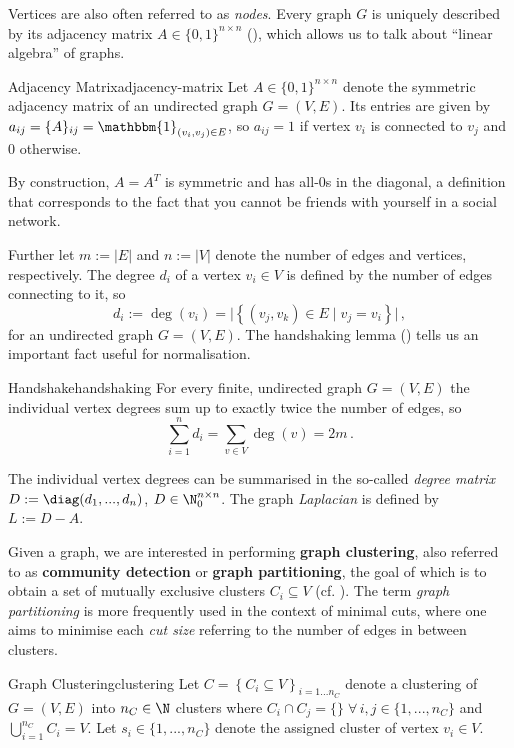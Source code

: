 \documentclass[12pt, a4paper]{article}
\newcommand{\identity}{\mathbbm{1}}
\begin{document}
  Vertices are also often referred to as \textit{nodes}.
  Every graph $G$ is uniquely described by its adjacency matrix $A \in \{0, 1\}^{n \times n}$ (), which allows us to talk about ``linear algebra'' of graphs.

  \begin{definition}{Adjacency Matrix}{adjacency-matrix}
    Let $A \in \{0, 1\}^{n \times n}$ denote the symmetric adjacency matrix of an undirected graph $G = (V, E)$. Its entries are given by $a_{ij} = \{A\}_{ij} = \identity_{(v_i, v_j) \in E}$, so $a_{ij} = 1$ if vertex $v_i$ is connected to $v_j$ and $0$ otherwise.
  \end{definition}

  By construction, $A = A^T$ is symmetric and has all-$0$s in the diagonal, a definition that corresponds to the fact that you cannot be friends with yourself in a social network.

  Further let $m := |E|$ and $n := |V|$ denote the number of edges and vertices, respectively.
  The degree $d_i$ of a vertex $v_i \in V$ is defined by the number of edges connecting to it, so $$d_i := \deg(v_i) = \big|\left\{(v_j, v_k) \in E \;|\; v_j = v_i\right\}\big|\,,$$ for an undirected graph $G = (V, E)$. The handshaking lemma () tells us an important fact useful for normalisation.
  \begin{lemma}{Handshake}{handshaking}
    For every finite, undirected graph $G = (V, E)$ the individual vertex degrees sum up to exactly twice the number of edges, so $$\sum_{i=1}^{n} d_i = \sum_{v \in V} \deg(v) = 2m\,.$$
  \end{lemma}

  The individual vertex degrees can be summarised in the so-called \textit{degree matrix} $D := \diag(d_1, ..., d_n)$, $D \in \N_0^{n \times n}$. The graph \textit{Laplacian} is defined by $L := D - A$.

  Given a graph, we are interested in performing \textbf{graph clustering}, also referred to as \textbf{community detection} or \textbf{graph partitioning}, the goal of which is to obtain a set of mutually exclusive clusters $C_i \subseteq V$ (cf. ).
  The term \textit{graph partitioning} is more frequently used in the context of minimal cuts, where one aims to minimise each \textit{cut size} referring to the number of edges in between clusters.

  \begin{definition}{Graph Clustering}{clustering}
    Let $C = \left\{C_i \subseteq V \right\}_{i=1 ... n_C}$ denote a clustering of $G = (V, E)$ into $n_C \in \N$ clusters where $C_i \cap C_j = \{\} \; \forall\,i, j \in \{1, ..., n_C\}$ and $\bigcup_{i=1}^{n_C} C_i = V$. Let $s_i \in \{1, ..., n_C\}$ denote the assigned cluster of vertex $v_i \in V$.
  \end{definition}
\end{document}
